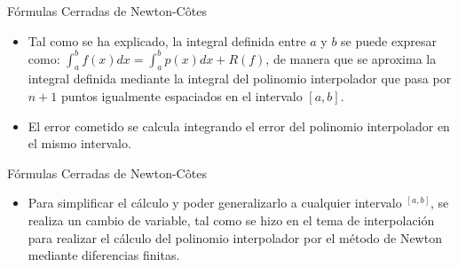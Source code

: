 \documentclass[12pt]{beamer}
\begin{document}
\begin{frame}{F\'ormulas Cerradas de Newton-C\^otes}
  \begin{itemize}
    \item Tal como se ha explicado, la integral definida entre $a$ y $b$ se puede expresar como: $\int_a^bf(x)dx =\int_{a}^{b}p(x)dx+R(f)$, de manera que se aproxima la integral definida mediante la integral del
    polinomio interpolador que pasa por $n+1$ puntos igualmente espaciados en el intervalo $[a,b]$.
    \item<2->El error cometido se calcula integrando el error del polinomio interpolador en el mismo intervalo.
  \end{itemize}
\end{frame}
\begin{frame}{F\'ormulas Cerradas de Newton-C\^otes}
  \begin{itemize}
    \item<1->Para simplificar el cálculo y poder generalizarlo a cualquier intervalo $^[a,b]$, se realiza un cambio de variable,
    tal como se hizo en el tema de interpolación para realizar el cálculo del polinomio interpolador por el
    método de Newton mediante diferencias finitas.
    \begin{center}
\end{center}
\end{itemize}
\end{frame}
\end{document}
